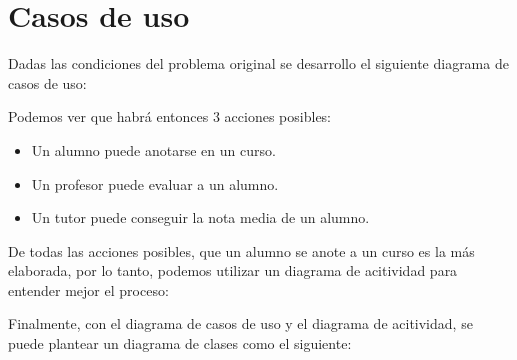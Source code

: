 \documentclass{article}
\begin{document}
\section{Casos de uso}

Dadas las condiciones del problema original se desarrollo el siguiente
diagrama de casos de uso:

\begin{figure}[H]
    \centering
    \scalebox{.75}{
        
    }
\end{figure}

Podemos ver que habrá entonces 3 acciones posibles:
\begin{itemize}
    \item Un alumno puede anotarse en un curso.
    \item Un profesor puede evaluar a un alumno.
    \item Un tutor puede conseguir la nota media de un alumno.
\end{itemize}

\pagebreak
De todas las acciones posibles, que un alumno se anote a un curso es la más
elaborada, por lo tanto, podemos utilizar un diagrama de acitividad para
entender mejor el proceso:
\begin{figure}[H]
    \centering
    \scalebox{.75}{
        
    }
\end{figure}

\pagebreak
Finalmente, con el diagrama de casos de uso y el diagrama de acitividad, se
puede plantear un diagrama de clases como el siguiente:
\begin{figure}[H]
    \centering
    \scalebox{.5}{
        
    }
\end{figure}
\end{document}
